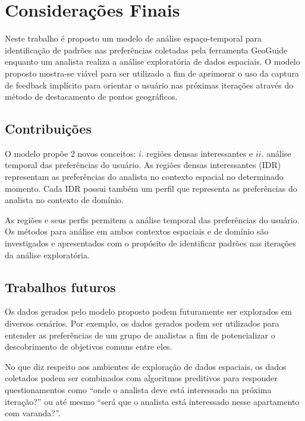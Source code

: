 \chapter{Considerações Finais}
\label{chap:conclusao}

Neste trabalho é proposto um modelo de análise espaço-temporal para identificação de padrões nas preferências coletadas pela ferramenta GeoGuide enquanto um analista realiza a análise exploratória de dados espaciais. O modelo proposto mostra-se viável para ser utilizado a fim de aprimorar o uso da captura de feedback implícito para orientar o usuário nas próximas iterações através do método de destacamento de pontos geográficos.

\section{Contribuições}

O modelo propõe 2 novos conceitos: $i$. regiões densas interessantes e $ii$. análise temporal das preferências do usuário. As regiões densas interessantes (IDR) representam as preferências do analista no contexto espacial no determinado momento. Cada IDR possui também um perfil que representa as preferências do analista no contexto de domínio.

As regiões e seus perfis permitem a análise temporal das preferências do usuário. Os métodos para análise em ambos contextos espaciais e de domínio são investigados e apresentados com o propósito de identificar padrões nas iterações da análise exploratória.

\section{Trabalhos futuros}

Os dados gerados pelo modelo proposto podem futuramente ser explorados em diversos cenários. Por exemplo, os dados gerados podem ser utilizados para entender as preferências de um grupo de analistas a fim de potencializar o descobrimento de objetivos comuns entre eles.

No que diz respeito aos ambientes de exploração de dados espaciais, os dados coletados podem ser combinados com algoritmos preditivos para responder questionamentos como ``onde o analista deve está interessado na próxima iteração?'' ou até mesmo ``será que o analista está interessado nesse apartamento com varanda?''.  